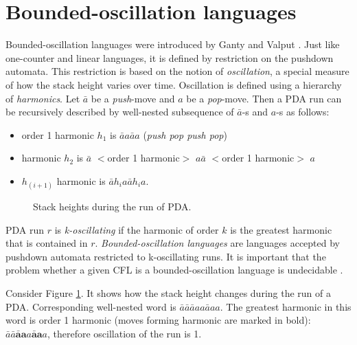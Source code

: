 \section{Bounded-oscillation languages}
\label{sec:osc}
Bounded-oscillation languages were introduced by Ganty and Valput \cite{BoundOsc}. Just like one-counter and linear languages, it is defined by restriction on the pushdown automata. This restriction is based on the notion of \textit{oscillation}, a special measure of how the stack height varies over time. Oscillation is defined using a hierarchy of \textit{harmonics}. Let $\bar{a}$ be a \textit{push}-move and $a$ be a \textit{pop}-move. Then a PDA run can be recursively described by well-nested subsequence of $\bar{a}$-s and $a$-s as follows:
\begin{itemize}
\item  order 1 harmonic $h_1$ is $\bar{a}a\bar{a}a$ (\textit{push pop push pop})
\item  harmonic $h_2$ is $\bar{a}$ $<$order 1 harmonic$>$ $a\bar{a}$ $<$order 1 harmonic$>$ $a$
\item  $h_{(i+1)}$ harmonic is $\bar{a}h_ia\bar{a}h_ia$.
\end{itemize}
\begin{figure}
\centering
{}
\caption{Stack heights during the run of PDA.}
\label{oscb}
\end{figure}


PDA run $r$ is \textit{k-oscillating} if the harmonic of order $k$ is the greatest harmonic that is contained in $r$. \textit{Bounded-oscillation languages} are languages accepted by pushdown automata restricted to k-oscillating runs. It is important that the problem whether a given CFL is a bounded-oscillation language is undecidable \cite{BoundOsc}.
\begin{example}
Consider Figure \ref{oscb}. It shows how the stack height changes during the run of a PDA. Corresponding well-nested word is $\bar{a}\bar{a}\bar{a}aa\bar{a}aa$. The greatest harmonic in this word is order 1 harmonic (moves forming harmonic are marked in bold): $\bar{a}\bar{a}\mathbf{\bar{a}a}a\mathbf{\bar{a}a}a$, therefore oscillation of the run is 1.
\end{example}


